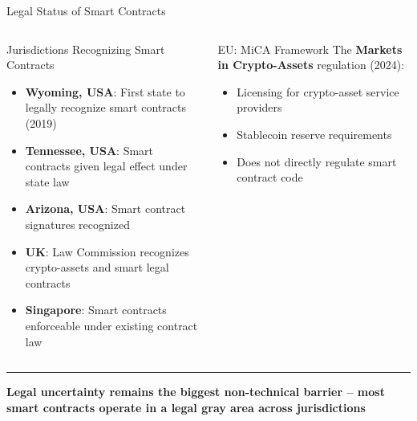 \documentclass[8pt,aspectratio=169]{beamer}
\newcommand{\bottomnote}[1]{\vfill\vspace{-2mm}\textcolor{mllavender2}{\rule{\textwidth}{0.4pt}}\vspace{1mm}\footnotesize\textbf{#1}}
\begin{document}
\begin{frame}{Legal Status of Smart Contracts}
\begin{columns}[T]
\begin{block}{Jurisdictions Recognizing Smart Contracts}
\footnotesize
\begin{itemize}
  \item \textbf{Wyoming, USA}: First state to legally recognize smart contracts (2019)
  \item \textbf{Tennessee, USA}: Smart contracts given legal effect under state law
  \item \textbf{Arizona, USA}: Smart contract signatures recognized
  \item \textbf{UK}: Law Commission recognizes crypto-assets and smart legal contracts
  \item \textbf{Singapore}: Smart contracts enforceable under existing contract law
\end{itemize}
\end{block}
\vspace{2mm}
\begin{exampleblock}{EU: MiCA Framework}
\footnotesize
The \textbf{Markets in Crypto-Assets} regulation (2024):
\begin{itemize}
  \item Licensing for crypto-asset service providers
  \item Stablecoin reserve requirements
  \item Does not directly regulate smart contract code
\end{itemize}
\end{exampleblock}
\end{columns}
\bottomnote{Legal uncertainty remains the biggest non-technical barrier -- most smart contracts operate in a legal gray area across jurisdictions}
\end{frame}
\end{document}

